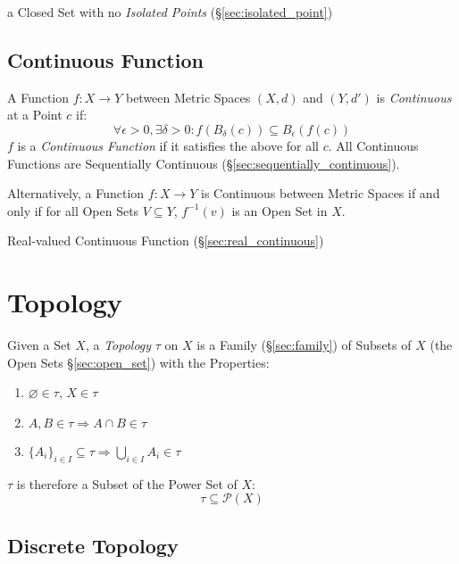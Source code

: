a Closed Set with no \emph{Isolated Points}
(\S\ref{sec:isolated_point})



\subsection{Continuous Function}\label{sec:continuous_function}

A Function $f : X \rightarrow Y$ between Metric Spaces $(X,d)$ and
$(Y,d')$ is \emph{Continuous} at a Point $c$ if:
\[
  \forall \epsilon > 0, \exists \delta > 0 :
  f (B_{\delta}(c)) \subseteq B_{\epsilon}(f(c))
\]
$f$ is a \emph{Continuous Function} if it satisfies the above for all
$c$. All Continuous Functions are Sequentially Continuous
(\S\ref{sec:sequentially_continuous}).

Alternatively, a Function $f: X \rightarrow Y$ is Continuous between
Metric Spaces if and only if for all Open Sets $V \subseteq Y$,
$f^{-1}(v)$ is an Open Set in $X$.

Real-valued Continuous Function (\S\ref{sec:real_continuous})



\section{Topology}\label{sec:topology}

Given a Set $X$, a \emph{Topology} $\tau$ on $X$ is a Family
(\S\ref{sec:family}) of Subsets of $X$ (the Open Sets
\S\ref{sec:open_set}) with the Properties:
\begin{enumerate}
  \item $\varnothing \in \tau$, $X \in \tau$
  \item $A,B \in \tau \Rightarrow A \cap B \in \tau$
  \item $\{A_i\}_{i \in I} \subseteq \tau \Rightarrow \bigcup_{i \in
  I} A_i \in \tau$
\end{enumerate}
$\tau$ is therefore a Subset of the Power Set of $X$:
\[
  \tau \subseteq \mathcal{P}(X)
\]



\subsection{Discrete Topology}\label{sec:discrete_topology}

